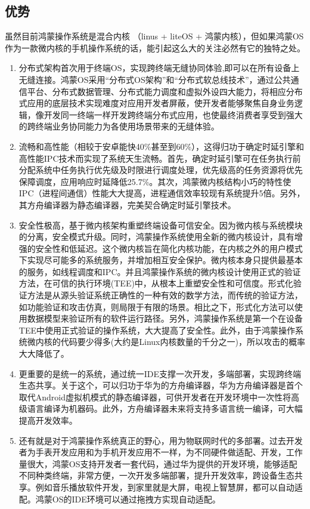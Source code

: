 \documentclass{article}
\begin{document}
\subsection{优势}
虽然目前鸿蒙操作系统是混合内核 （linus + liteOS + 鸿蒙内核），但如果鸿蒙OS作为一款微内核的手机操作系统的话，能引起这么大的关注必然有它的独特之处。\par
\begin{enumerate}
    \item {分布式架构首次用于终端OS，实现跨终端无缝协同体验,即可以在所有设备上无缝连接。鸿蒙OS采用“分布式OS架构”和“分布式软总线技术”，通过公共通信平台、分布式数据管理、分布式能力调度和虚拟外设四大能力，将相应分布式应用的底层技术实现难度对应用开发者屏蔽，使开发者能够聚焦自身业务逻辑，像开发同一终端一样开发跨终端分布式应用，也使最终消费者享受到强大的跨终端业务协同能力为各使用场景带来的无缝体验。}
    \item {流畅和高性能（相较于安卓能快40\%甚至到60\%），这得归功于确定时延引擎和高性能IPC技术而实现了系统天生流畅。首先，确定时延引擎可在任务执行前分配系统中任务执行优先级及时限进行调度处理，优先级高的任务资源将优先保障调度，应用响应时延降低25.7\%。其次，鸿蒙微内核结构小巧的特性使IPC（进程间通信）性能大大提高，进程通信效率较现有系统提升5倍。另外，其方舟编译器为静态编译器，完美契合确定时延引擎技术。}
    \item {安全性极高，基于微内核架构重塑终端设备可信安全。因为微内核与系统模块的分离，安全模式升级。同时，鸿蒙操作系统使用全新的微内核设计，具有增强的安全性和低延迟。这个微内核旨在简化内核功能，在内核之外的用户模式下实现尽可能多的系统服务，并增加相互安全保护。微内核本身只提供最基本的服务，如线程调度和IPC。并且鸿蒙操作系统的微内核设计使用正式的验证方法，在可信的执行环境(TEE)中，从根本上重塑安全性和可信度。形式化验证方法是从源头验证系统正确性的一种有效的数学方法，而传统的验证方法，如功能验证和攻击仿真，则局限于有限的场景。相比之下，形式化方法可以使用数据模型来验证所有的软件运行路径。另外，鸿蒙操作系统是第一个在设备TEE中使用正式验证的操作系统，大大提高了安全性。此外，由于鸿蒙操作系统微内核的代码要少得多(大约是Linux内核数量的千分之一)，所以攻击的概率大大降低了。}
    \item {更重要的是统一的系统，通过统一IDE支撑一次开发，多端部署，实现跨终端生态共享。关于这个，可以归功于华为的方舟编译器，华为方舟编译器是首个取代Android虚拟机模式的静态编译器，可供开发者在开发环境中一次性将高级语言编译为机器码。此外，方舟编译器未来将支持多语言统一编译，可大幅提高开发效率。 \cite{ref3} } 
    \item {还有就是对于鸿蒙操作系统真正的野心，用为物联网时代的多部署。过去开发者为手表开发应用和为手机开发应用不一样，为不同硬件做适配、开发，工作量很大，鸿蒙OS支持开发者一套代码，通过华为提供的开发环境，能够适配不同种类终端，非常方便，一次开发多端部署，提升开发效率，跨设备生态共享。例如音乐播放软件开发，到家里就是大屏，电视上智慧屏，都可以自动适配。鸿蒙OS的IDE环境可以通过拖拽方实现自动适配。}

\end{enumerate}
\end{document}
